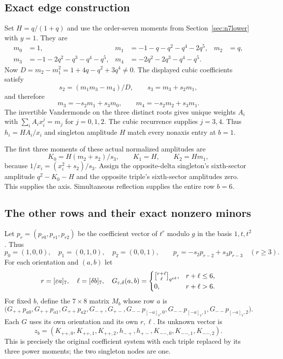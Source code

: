\documentclass[11pt,letterpaper]{article}
\theoremstyle{definition}\newtheorem{definition}[theorem]{Definition}
\newcommand{\gb}[3]{\genfrac{[}{]}{0pt}{}{#1}{#2}_{#3}}
\begin{document}
\subsection{Exact edge construction}

Set $H=q/(1+q)$ and use the order-seven moments from Section~\ref{sec:n7lower} with $y=1$. They are
\begin{align*}
 m_0&=1,& m_1&=-1-q-q^2-q^4-2q^5,& m_2&=q,\\
 m_3&=-1-2q^2-q^3-q^4-q^5,&
 m_4&=-2q^2-2q^3-q^4-q^5.
\end{align*}
Now $D=m_2-m_1^2=1+4q-q^2+3q^4\ne0$. The displayed cubic coefficients satisfy
\[
 s_2=(m_1m_3-m_4)/D,\qquad s_3=m_3+s_2m_1,
\]
and therefore
\[
 m_3=-s_2m_1+s_3m_0,\qquad m_4=-s_2m_2+s_3m_1.
\]
The invertible Vandermonde on the three distinct roots gives unique weights $A_i$ with $\sum_iA_ix_i^j=m_j$ for $j=0,1,2$. The cubic recurrence supplies $j=3,4$. Thus $h_i=HA_i/x_i$ and singleton amplitude $H$ match every nonaxis entry at $b=1$.

The first three moments of these actual normalized amplitudes are
\[
 K_0=H(m_2+s_2)/s_3,\qquad K_1=H,\qquad K_2=Hm_1,
\]
because $1/x_i=(x_i^2+s_2)/s_3$. Assign the opposite-delta singleton's sixth-sector amplitude $q^2-K_0-H$ and the opposite triple's sixth-sector amplitudes zero. This supplies the axis. Simultaneous reflection supplies the entire row $b=6$.

\subsection{The other rows and their exact nonzero minors}

Let $p_r=(p_{r0},p_{r1},p_{r2})$ be the coefficient vector of $t^r$ modulo $g$ in the basis $1,t,t^2$. Thus
\[
 p_0=(1,0,0),\quad p_1=(0,1,0),\quad p_2=(0,0,1),\qquad
 p_r=-s_2p_{r-2}+s_3p_{r-3}\quad(r\geq3).
\]
For each orientation and $(a,b)$ let
\[
 r=[\eps a]_7,\quad \ell=[\delta b]_7,\quad
 G_{\eps,\delta}(a,b)=
 \begin{cases}\gb{r+\ell}{\ell}{q^{\eps\delta}},&r+\ell\leq6,\\0,&r+\ell>6.\end{cases}
\]
For fixed $b$, define the $7\times8$ matrix $M_b$ whose row $a$ is
\[
 \bigl(G_{++}p_{a0},G_{++}p_{a1},G_{++}p_{a2},
 G_{-+},G_{+-},
 G_{--}p_{[-a]_7,0},G_{--}p_{[-a]_7,1},G_{--}p_{[-a]_7,2}\bigr).
\]
Each $G$ uses its own orientation and its own $r,\ell$. Its unknown vector is
\[
 z_b=(K_{++,0},K_{++,1},K_{++,2},h_{-+},h_{+-},
 K_{--,0},K_{--,1},K_{--,2}).
\]
This is precisely the original coefficient system with each triple replaced by its three power moments; the two singleton nodes are one.
\end{document}
